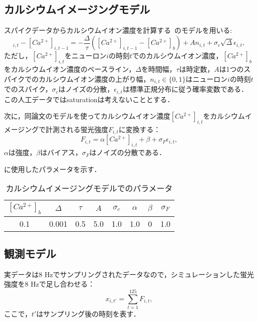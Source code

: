 \subsection{カルシウムイメージングモデル}
スパイクデータからカルシウムイオン濃度を計算する~\cite{Vogelstein2009}のモデルを用いる:
\begin{equation}
  [Ca^{2+}]_{i,t} - [Ca^{2+}]_{i,t-1} = - \frac{\Delta}{\tau}([Ca^{2+}]_{i,t-1} - [Ca^{2+}]_b) + An_{i,t} + \sigma_c \sqrt{\Delta} \epsilon_{i,t},
  \label{eq:calcium}
\end{equation}
ただし，$[Ca^{2+}]_{i,t}$をニューロン$i$の時刻$t$でのカルシウムイオン濃度，$[Ca^{2+}]_b$をカルシウムイオン濃度のベースライン，$\Delta$を時間幅，$\tau$は時定数，$A$は1つのスパイクでのカルシウムイオン濃度の上がり幅，$n_{i,t} \in \{0,1\}$はニューロン$i$の時刻$t$でのスパイク，$\sigma_c$はノイズの分散，$\epsilon_{i,t}$は標準正規分布に従う確率変数である．
この人工データではsaturationは考えないこととする．

次に，同論文のモデルを使ってカルシウムイオン濃度$[Ca^{2+}]_{i,t}$をカルシウムイメージングで計測される蛍光強度$F_{i,t}$に変換する：
\begin{equation}
	F_{i,t} = \alpha[Ca^{2+}]_{i,t} + \beta + \sigma_F \epsilon_{i,t},
  \label{eq:intensity}
\end{equation}
$\alpha$は強度，$\beta$はバイアス，$\sigma_F$はノイズの分散である．

に使用したパラメータを示す．

\begin{table}[htb]
  \center
  \begin{tabular}{|cccccccc|} \hline
    $[Ca^{2+}]_b$ & $\Delta$ & $\tau$ & $A$ & $\sigma_c$ & $\alpha$ & $\beta$ & $\sigma_F$ \\ \hline
    0.1 & 0.001 & 0.5 & 5.0 & 1.0 & 1.0 & 0 & 1.0 \\ \hline
  \end{tabular}
  \caption{カルシウムイメージングモデルでのパラメータ}
  \label{tab:parameter2}
\end{table}

\subsection{観測モデル}
実データは8 Hzでサンプリングされたデータなので，シミュレーションした蛍光強度を8 Hzで足し合わせる：
\begin{equation}
  x_{i,t'} = \sum_{t=1}^{125} F_{i,t},
  \label{eq:observation}
\end{equation}
ここで，$t'$はサンプリング後の時刻を表す．

